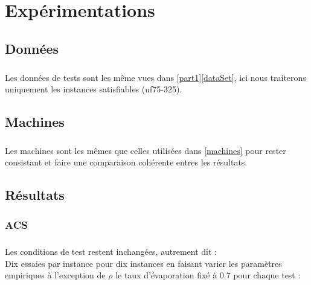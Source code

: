 \chapter{Expérimentations}
\section{Données}
\paragraph{}
Les données de tests sont les même vues dans \ref{part1}\ref{dataSet}, ici nous traiterons uniquement les instances satisfiables (uf75-325).

\section{Machines}
\paragraph{}Les machines sont les mêmes que celles utilisées dans \ref{machines} pour rester consistant et faire une comparaison cohérente entres les résultats.
\section{Résultats}
\subsection{ACS}
\paragraph{}\label{testconds}
Les conditions de test restent inchangées, autrement dit : \\
Dix essaies par instance pour dix instances en faisant varier les paramètres empiriques à l'exception de $\rho$ le taux d'évaporation fixé à 0.7 pour chaque test : 
